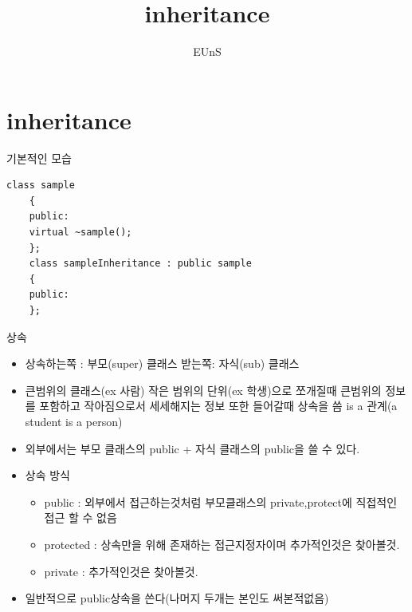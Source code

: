 \documentclass[10pt]{beamer}
\title{inheritance}
\author{EUnS}
\begin{document}
\begin{frame}{}
    \maketitle
\end{frame}    

\begin{frame}{}
    \tableofcontents
\end{frame}   

\section{inheritance}


\begin{frame}[fragile]{기본적인 모습}
    \begin{lstlisting}[style = CppStyle]
    class sample
    {
    public:
    virtual ~sample();
    };
    class sampleInheritance : public sample
    {
    public:
    };
    \end{lstlisting}
\end{frame}    


\begin{frame}{상속}
    \begin{itemize}
        \item 상속하는쪽 : 부모(super) 클래스 받는쪽: 자식(sub) 클래스
        \item 큰범위의 클래스(ex 사람) 작은 범위의 단위(ex 학생)으로 쪼개질때 큰범위의 정보를 포함하고 작아짐으로서 세세해지는 정보 또한 들어갈때 상속을 씀 is a 관계(a student is a person)
        \item 외부에서는 부모 클래스의 public + 자식 클래스의 public을 쓸 수 있다.
        \item 상속 방식 
        \begin{itemize}
            \item public : 외부에서 접근하는것처럼 부모클래스의 private,protect에 직접적인 접근 할 수 없음
            \item protected : 상속만을 위해 존재하는 접근지정자이며 추가적인것은 찾아볼것.
            \item private : 추가적인것은 찾아볼것.
        \end{itemize}
        \item 일반적으로 public상속을 쓴다(나머지 두개는 본인도 써본적없음)
    \end{itemize}
\end{frame}
\end{document}
